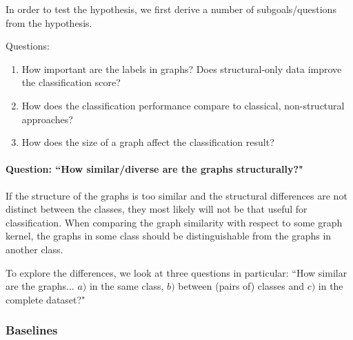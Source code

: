 In order to test the hypothesis, we first derive a number of subgoals/questions from the hypothesis.

Questions:
\begin{enumerate}
    \item{How important are the labels in graphs? Does structural-only data improve the classification score?}
    \item{How does the classification performance compare to classical, non-structural approaches?}
    \item{How does the size of a graph affect the classification result?}
\end{enumerate}

\paragraph{Question: ``How similar/diverse are the graphs structurally?"}
If the structure of the graphs is too similar and the structural differences are not distinct between the classes, they most likely will not be that useful for classification.
When comparing the graph similarity with respect to some graph kernel, the graphs in some class should be distinguishable from the graphs in another class.

To explore the differences, we look at three questions in particular:
``How similar are the graphs... $a)$ in the same class, $b)$ between (pairs of) classes and $c)$ in the complete dataset?"



\subsubsection{Baselines}

